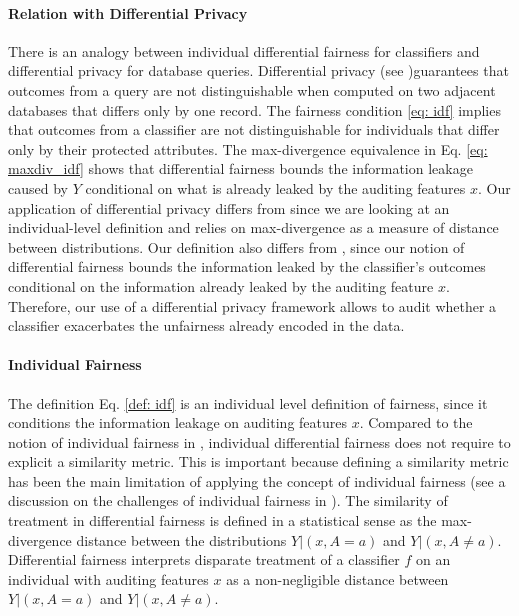 \documentclass{article}
\begin{document}
\paragraph{Relation with Differential Privacy}
There is an analogy between individual differential fairness for classifiers and differential privacy for database queries. Differential privacy (see \cite{dwork2014algorithmic} )guarantees that outcomes from a query are not distinguishable when computed on two adjacent databases that differs only by one record. The fairness condition \eqref{eq: idf} implies that outcomes from a classifier are not distinguishable for individuals that differ only by their protected attributes. The max-divergence equivalence in Eq. \eqref{eq: maxdiv_idf} shows that differential fairness bounds the information leakage caused by $Y$ conditional on what is already leaked by the auditing features $x$. Our application of differential privacy differs from \cite{jagielski2018differentially} since we are looking at an individual-level definition and relies on max-divergence as a measure of distance between distributions.  Our definition also differs from \cite{foulds2018intersectional}, since our notion of differential fairness bounds the information leaked by the classifier's outcomes conditional on the information already leaked by the auditing feature $x$. Therefore, our use of a differential privacy framework allows to audit whether a classifier exacerbates the unfairness already encoded in the data.


\paragraph{Individual Fairness}
The definition Eq. \eqref{def: idf} is an individual level definition of fairness, since it conditions the information leakage on auditing features $x$. Compared to the notion of individual fairness in \cite{dwork2012fairness}, individual differential fairness does not require to explicit a similarity metric. This is important because defining a similarity metric has been the main limitation of applying the concept of individual fairness (see a discussion on the challenges of individual fairness in \cite{chouldechova2018frontiers}). The similarity of treatment in differential fairness is defined in a statistical sense as the max-divergence distance between the distributions $Y|(x, A=a)$ and $Y|(x, A\neq a)$. Differential fairness interprets disparate treatment of a classifier $f$ on an individual with auditing features $x$ as a non-negligible distance between $Y|(x, A=a)$ and $Y|(x, A\neq a)$. 
\end{document}
